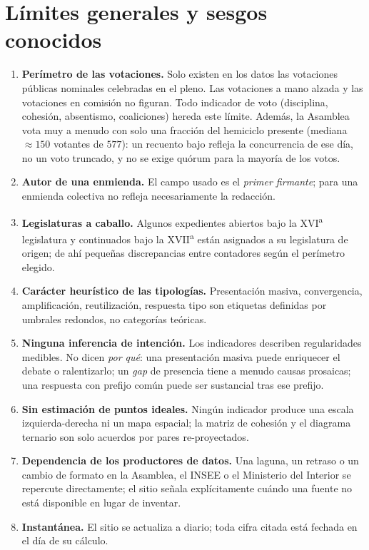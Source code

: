 \section{Límites generales y sesgos conocidos}\label{sec:limites-es}
\begin{enumerate}[label=L\arabic*.]
  \item \textbf{Perímetro de las votaciones.} Solo existen en los datos las
        votaciones públicas nominales celebradas en el pleno. Las votaciones a mano
        alzada y las votaciones en comisión no figuran. Todo indicador de voto
        (disciplina, cohesión, absentismo, coaliciones) hereda este límite. Además,
        la Asamblea vota muy a menudo con solo una fracción del hemiciclo presente
        (mediana $\approx 150$ votantes de $577$): un recuento bajo refleja la
        concurrencia de ese día, no un voto truncado, y no se exige quórum para la
        mayoría de los votos.
  \item \textbf{\og{}Autor\fg{} de una enmienda.} El campo usado es el \emph{primer
        firmante}; para una enmienda colectiva no refleja necesariamente la
        redacción.
  \item \textbf{Legislaturas a caballo.} Algunos expedientes abiertos bajo la
        XVI\textsuperscript{a} legislatura y continuados bajo la XVII\textsuperscript{a}
        están asignados a su legislatura de origen; de ahí pequeñas discrepancias
        entre contadores según el perímetro elegido.
  \item \textbf{Carácter heurístico de las tipologías.} \og{}Presentación masiva\fg{},
        \og{}convergencia\fg{}, \og{}amplificación\fg{}, \og{}reutilización\fg{},
        \og{}respuesta tipo\fg{} son etiquetas definidas por umbrales redondos, no
        categorías teóricas.
  \item \textbf{Ninguna inferencia de intención.} Los indicadores describen
        regularidades medibles. No dicen \emph{por qué}: una presentación masiva
        puede enriquecer el debate o ralentizarlo; un \emph{gap} de presencia tiene
        a menudo causas prosaicas; una respuesta con prefijo común puede ser
        sustancial tras ese prefijo.
  \item \textbf{Sin estimación de puntos ideales.} Ningún indicador produce una
        escala izquierda-derecha ni un mapa espacial; la matriz de cohesión y el
        diagrama ternario son solo acuerdos por pares re-proyectados.
  \item \textbf{Dependencia de los productores de datos.} Una laguna, un retraso o
        un cambio de formato en la Asamblea, el INSEE o el Ministerio del Interior se
        repercute directamente; el sitio señala explícitamente cuándo una fuente no
        está disponible en lugar de inventar.
  \item \textbf{Instantánea.} El sitio se actualiza a diario; toda cifra citada está
        fechada en el día de su cálculo.
\end{enumerate}

